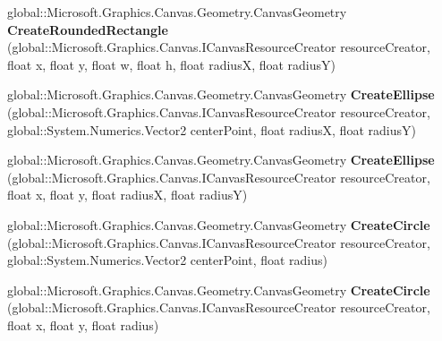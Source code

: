 \begin{DoxyCompactItemize}
\mbox{\label{interface_microsoft_1_1_graphics_1_1_canvas_1_1_geometry_1_1_i_canvas_geometry_statics_af546671007c12a6d9127c6fca9180c5b}} 
global\+::\+Microsoft.\+Graphics.\+Canvas.\+Geometry.\+Canvas\+Geometry {\bfseries Create\+Rounded\+Rectangle} (global\+::\+Microsoft.\+Graphics.\+Canvas.\+I\+Canvas\+Resource\+Creator resource\+Creator, float x, float y, float w, float h, float radiusX, float radiusY)
\item 
\mbox{\label{interface_microsoft_1_1_graphics_1_1_canvas_1_1_geometry_1_1_i_canvas_geometry_statics_ab568c0cde767f2a6103d7a1052f40358}} 
global\+::\+Microsoft.\+Graphics.\+Canvas.\+Geometry.\+Canvas\+Geometry {\bfseries Create\+Ellipse} (global\+::\+Microsoft.\+Graphics.\+Canvas.\+I\+Canvas\+Resource\+Creator resource\+Creator, global\+::\+System.\+Numerics.\+Vector2 center\+Point, float radiusX, float radiusY)
\item 
\mbox{\label{interface_microsoft_1_1_graphics_1_1_canvas_1_1_geometry_1_1_i_canvas_geometry_statics_addd384355b7e85eba839be661ab3dff0}} 
global\+::\+Microsoft.\+Graphics.\+Canvas.\+Geometry.\+Canvas\+Geometry {\bfseries Create\+Ellipse} (global\+::\+Microsoft.\+Graphics.\+Canvas.\+I\+Canvas\+Resource\+Creator resource\+Creator, float x, float y, float radiusX, float radiusY)
\item 
\mbox{\label{interface_microsoft_1_1_graphics_1_1_canvas_1_1_geometry_1_1_i_canvas_geometry_statics_ad8d580654397bcf2af6830928e681dc2}} 
global\+::\+Microsoft.\+Graphics.\+Canvas.\+Geometry.\+Canvas\+Geometry {\bfseries Create\+Circle} (global\+::\+Microsoft.\+Graphics.\+Canvas.\+I\+Canvas\+Resource\+Creator resource\+Creator, global\+::\+System.\+Numerics.\+Vector2 center\+Point, float radius)
\item 
\mbox{\label{interface_microsoft_1_1_graphics_1_1_canvas_1_1_geometry_1_1_i_canvas_geometry_statics_a451b4303daecd5545b17b3e57305e02f}} 
global\+::\+Microsoft.\+Graphics.\+Canvas.\+Geometry.\+Canvas\+Geometry {\bfseries Create\+Circle} (global\+::\+Microsoft.\+Graphics.\+Canvas.\+I\+Canvas\+Resource\+Creator resource\+Creator, float x, float y, float radius)

\end{DoxyCompactItemize}
